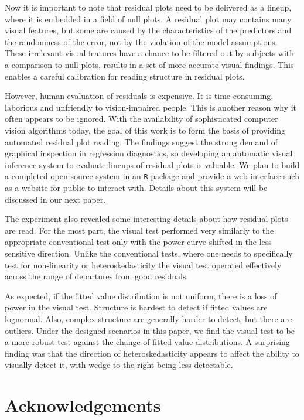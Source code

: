 \documentclass[]{interact}
\theoremstyle{plain}%
\theoremstyle{definition}
\theoremstyle{remark}
\begin{document}
Now it is important to note that residual plots need to be delivered as
a lineup, where it is embedded in a field of null plots. A residual plot
may contains many visual features, but some are caused by the
characteristics of the predictors and the randomness of the error, not
by the violation of the model assumptions. These irrelevant visual
features have a chance to be filtered out by subjects with a comparison
to null plots, results in a set of more accurate visual findings. This
enables a careful calibration for reading structure in residual plots.

However, human evaluation of residuals is expensive. It is
time-consuming, laborious and unfriendly to vision-impaired people. This
is another reason why it often appears to be ignored. With the
availability of sophisticated computer vision algorithms today, the goal
of this work is to form the basis of providing automated residual plot
reading. The findings suggest the strong demand of graphical inspection
in regression diagnostics, so developing an automatic visual inference
system to evaluate lineups of residual plots is valuable. We plan to
build a completed open-source system in an \texttt{R} package and
provide a web interface such as a website for public to interact with.
Details about this system will be discussed in our next paper.

The experiment also revealed some interesting details about how residual
plots are read. For the most part, the visual test performed very
similarly to the appropriate conventional test only with the power curve
shifted in the less sensitive direction. Unlike the conventional tests,
where one needs to specifically test for non-linearity or
heteroskedasticity the visual test operated effectively across the range
of departures from good residuals.

As expected, if the fitted value distribution is not uniform, there is a
loss of power in the visual test. Structure is hardest to detect if
fitted values are lognormal. Also, complex structure are generally
harder to detect, but there are outliers. Under the designed scenarios
in this paper, we find the visual test to be a more robust test against
the change of fitted value distributions. A surprising finding was that
the direction of heteroskedasticity appears to affect the ability to
visually detect it, with wedge to the right being less detectable.

\hypertarget{acknowledgements}{%
\section*{Acknowledgements}\label{acknowledgements}}
\end{document}
